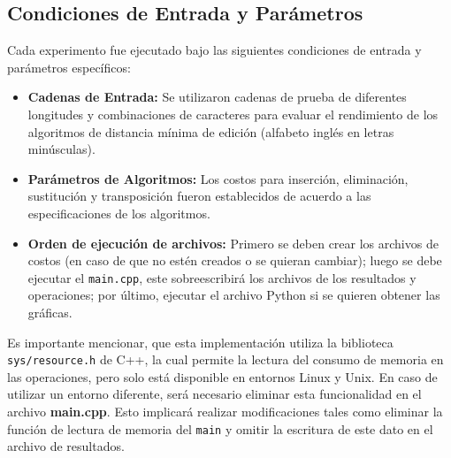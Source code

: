 \subsection*{Condiciones de Entrada y Parámetros}

Cada experimento fue ejecutado bajo las siguientes condiciones de entrada y parámetros específicos:
\begin{itemize}
    \item \textbf{Cadenas de Entrada:} Se utilizaron cadenas de prueba de diferentes longitudes y combinaciones de caracteres para evaluar el rendimiento de los algoritmos de distancia mínima de edición (alfabeto inglés en letras minúsculas). 
    \item \textbf{Parámetros de Algoritmos:} Los costos para inserción, eliminación, sustitución y transposición fueron establecidos de acuerdo a las especificaciones de los algoritmos.
    \item \textbf{Orden de ejecución de archivos:} Primero se deben crear los archivos de costos (en caso de que no estén creados o se quieran cambiar); luego se debe ejecutar el \verb|main.cpp|, este sobreescribirá los archivos de los resultados y operaciones; por último, ejecutar el archivo Python si se quieren obtener las gráficas.
\end{itemize}

Es importante mencionar, que esta implementación utiliza la biblioteca \texttt{sys/resource.h} de C++, la cual permite la lectura del consumo de memoria en las operaciones, pero solo está disponible en entornos Linux y Unix. En caso de utilizar un entorno diferente, será necesario eliminar esta funcionalidad en el archivo \textbf{main.cpp}. Esto implicará realizar modificaciones tales como eliminar la función de lectura de memoria del \texttt{main} y omitir la escritura de este dato en el archivo de resultados.



